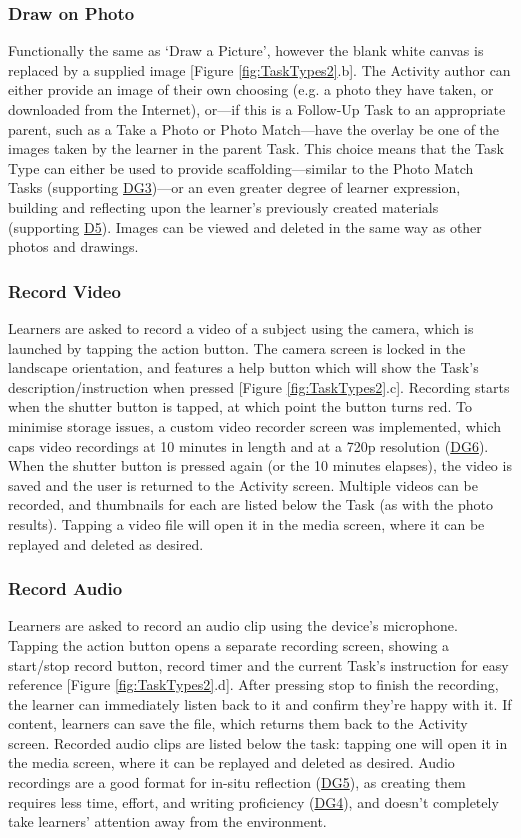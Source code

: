 \subsubsection*{Draw on Photo}
Functionally the same as `Draw a Picture', however the blank white canvas is replaced by a supplied image [Figure \ref{fig:TaskTypes2}.b]. The Activity author can either provide an image of their own choosing (e.g. a photo they have taken, or downloaded from the Internet), or---if this is a Follow-Up Task to an appropriate parent, such as a Take a Photo or Photo Match---have the overlay be one of the images taken by the learner in the parent Task. This choice means that the Task Type can either be used to provide scaffolding---similar to the Photo Match Tasks (supporting \hyperref[DG3]{DG3})---or an even greater degree of learner expression, building and reflecting upon the learner's previously created materials (supporting \hyperref[DG5]{D5}). Images can be viewed and deleted in the same way as other photos and drawings. 

\subsubsection*{Record Video}
Learners are asked to record a video of a subject using the camera, which is launched by tapping the action button. The camera screen is locked in the landscape orientation, and features a help button which will show the Task's description/instruction when pressed [Figure \ref{fig:TaskTypes2}.c]. Recording starts when the shutter button is tapped, at which point the button turns red. To minimise storage issues, a custom video recorder screen was implemented, which caps video recordings at 10 minutes in length and at a 720p resolution (\hyperref[DG6]{DG6}). When the shutter button is pressed again (or the 10 minutes elapses), the video is saved and the user is returned to the Activity screen. Multiple videos can be recorded, and thumbnails for each are listed below the Task (as with the photo results). Tapping a video file will open it in the media screen, where it can be replayed and deleted as desired.

\subsubsection*{Record Audio}
Learners are asked to record an audio clip using the device's microphone. Tapping the action button opens a separate recording screen, showing a start/stop record button, record timer and the current Task's instruction for easy reference [Figure \ref{fig:TaskTypes2}.d]. After pressing stop to finish the recording, the learner can immediately listen back to it and confirm they're happy with it. If content, learners can save the file, which returns them back to the Activity screen. Recorded audio clips are listed below the task: tapping one will open it in the media screen, where it can be replayed and deleted as desired. Audio recordings are a good format for in-situ reflection (\hyperref[DG5]{DG5}), as creating them requires less time, effort, and writing proficiency (\hyperref[DG4]{DG4}), and doesn't completely take learners' attention away from the environment.

